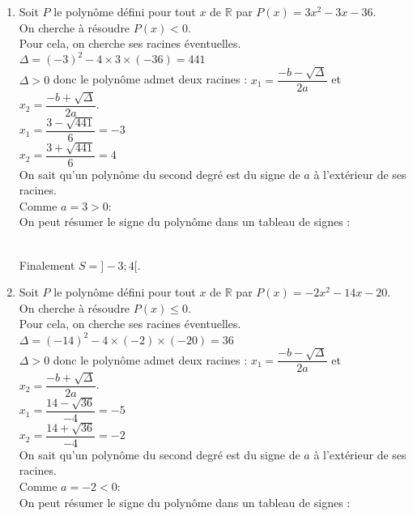 \documentclass[a4paper,11pt,exos]{nsi} %
\begin{document}
\begin{enumerate}[itemsep=1em]
        \item Soit $P$ le polynôme défini pour tout $x$ de $\mathbb R$ par $P(x)=3x^2-3x-36$.\\On cherche à résoudre $P(x)< 0$.\\Pour cela, on cherche ses racines éventuelles.\\$\Delta = (-3)^2-4\times3\times(-36)=441$\\$\Delta>0$ donc le polynôme admet deux racines : $x_1 = \dfrac{-b-\sqrt{\Delta}}{2a}$ et $x_2 = \dfrac{-b+\sqrt{\Delta}}{2a}$.\\$x_1 =\dfrac{3-\sqrt{441}}{6}=-3$\\$x_2 =\dfrac{3+\sqrt{441}}{6}=4$\\On sait qu'un polynôme du second degré est du signe de $a$ à l'extérieur de ses racines.\\Comme $a=3>0 :$\\On peut résumer le signe du polynôme dans un tableau de signes :\\
        \\[.5em]
        Finalement $S=]-3;4[$.
        \item Soit $P$ le polynôme défini pour tout $x$ de $\mathbb R$ par $P(x)=-2x^2-14x-20$.\\On cherche à résoudre $P(x)\leq 0$.\\Pour cela, on cherche ses racines éventuelles.\\$\Delta = (-14)^2-4\times(-2)\times(-20)=36$\\$\Delta>0$ donc  le polynôme admet deux racines : $x_1 = \dfrac{-b-\sqrt{\Delta}}{2a}$ et $x_2 = \dfrac{-b+\sqrt{\Delta}}{2a}$.\\$x_1 =\dfrac{14-\sqrt{36}}{-4}=-5$\\$x_2 =\dfrac{14+\sqrt{36}}{-4}=-2$\\On sait qu'un polynôme du second degré est du signe de $a$ à l'extérieur de ses racines.\\Comme $a=-2<0 :$\\On peut résumer le signe du polynôme dans un tableau de signes :\\
\end{enumerate}
\end{document}
